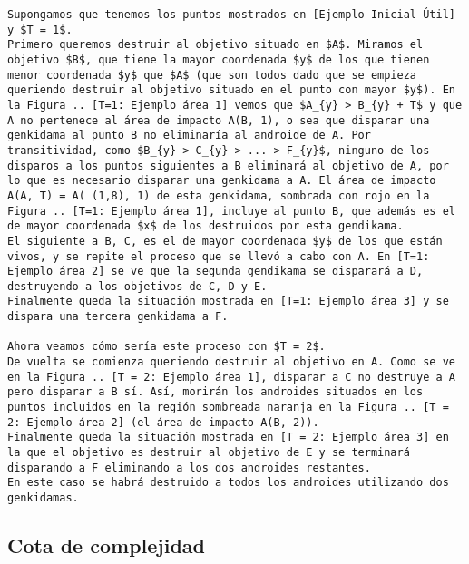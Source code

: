 \documentclass[10pt,a4paper]{article}
\begin{document}
\begin{verbatim}
Supongamos que tenemos los puntos mostrados en [Ejemplo Inicial Útil] y $T = 1$.
Primero queremos destruir al objetivo situado en $A$. Miramos el objetivo $B$, que tiene la mayor coordenada $y$ de los que tienen menor coordenada $y$ que $A$ (que son todos dado que se empieza queriendo destruir al objetivo situado en el punto con mayor $y$). En la Figura .. [T=1: Ejemplo área 1] vemos que $A_{y} > B_{y} + T$ y que A no pertenece al área de impacto A(B, 1), o sea que disparar una genkidama al punto B no eliminaría al androide de A. Por transitividad, como $B_{y} > C_{y} > ... > F_{y}$, ninguno de los disparos a los puntos siguientes a B eliminará al objetivo de A, por lo que es necesario disparar una genkidama a A. El área de impacto A(A, T) = A( (1,8), 1) de esta genkidama, sombrada con rojo en la Figura .. [T=1: Ejemplo área 1], incluye al punto B, que además es el de mayor coordenada $x$ de los destruidos por esta gendikama. 
El siguiente a B, C, es el de mayor coordenada $y$ de los que están vivos, y se repite el proceso que se llevó a cabo con A. En [T=1: Ejemplo área 2] se ve que la segunda gendikama se disparará a D, destruyendo a los objetivos de C, D y E.
Finalmente queda la situación mostrada en [T=1: Ejemplo área 3] y se dispara una tercera genkidama a F.

Ahora veamos cómo sería este proceso con $T = 2$.
De vuelta se comienza queriendo destruir al objetivo en A. Como se ve en la Figura .. [T = 2: Ejemplo área 1], disparar a C no destruye a A pero disparar a B sí. Así, morirán los androides situados en los puntos incluidos en la región sombreada naranja en la Figura .. [T = 2: Ejemplo área 2] (el área de impacto A(B, 2)).
Finalmente queda la situación mostrada en [T = 2: Ejemplo área 3] en la que el objetivo es destruir al objetivo de E y se terminará disparando a F eliminando a los dos androides restantes.
En este caso se habrá destruido a todos los androides utilizando dos genkidamas.
\end{verbatim}

\subsection{Cota de complejidad}
\begin{verbatim}

\end{verbatim}
\end{document}
